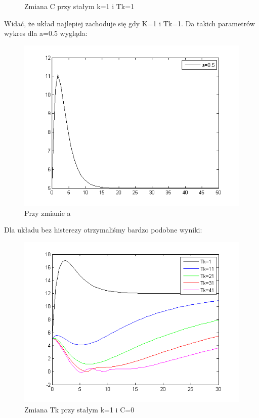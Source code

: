 \documentclass[a4paper,10pt]{article}
\begin{document}
\begin{enumerate}
\begin{figure}[!h]
	\caption{Zmiana C przy stałym k=1 i Tk=1}
    \label{fig:Rysunek}
\end{figure}

\newpage
Widać, że układ najlepiej zachoduje się gdy K=1 i Tk=1.
Da takich parametrów wykres dla a=0.5 wygląda:
\begin{figure}[!h]
    \centering
	\includegraphics[width=120mm]{CW3-korekcja-dwupolozeniowy-e_a.png}
	\caption{Przy zmianie a}
    \label{fig:Rysunek}
\end{figure}


\newpage

Dla układu bez histerezy otrzymaliśmy bardzo podobne wyniki:
\begin{figure}[!h]
    \centering
	\includegraphics[width=120mm]{CW3-korekcja-dwupolozeniowyBH-e_Tk.png}
	\caption{Zmiana Tk przy stałym k=1 i C=0}
    \label{fig:Rysunek}
\end{figure}


\end{enumerate}
\end{document}
